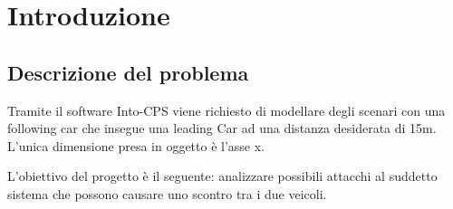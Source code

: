 \section{Introduzione}
\subsection{Descrizione del problema}
Tramite il software Into-CPS viene richiesto di modellare degli scenari con una following car che insegue una leading Car ad una distanza desiderata di 15m. L'unica dimensione presa in oggetto è l'asse x.

L'obiettivo del progetto è il seguente: analizzare possibili attacchi al suddetto sistema che possono causare uno scontro tra i due veicoli.


